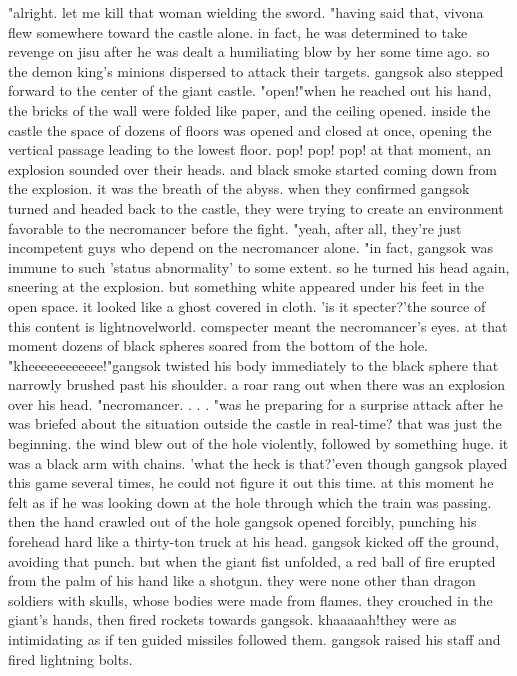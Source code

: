  "alright.
 let me kill that woman wielding the sword.
"having said that, vivona flew somewhere toward the castle alone.
in fact, he was determined to take revenge on jisu after he was dealt a humiliating blow by her some time ago.
so the demon king's minions dispersed to attack their targets.
gangsok also stepped forward to the center of the giant castle.
 "open!"when he reached out his hand, the bricks of the wall were folded like paper, and the ceiling opened.
 inside the castle the space of dozens of floors was opened and closed at once, opening the vertical passage leading to the lowest floor.
pop! pop! pop!
at that moment, an explosion sounded over their heads.
 and black smoke started coming down from the explosion.
 it was the breath of the abyss.
when they confirmed gangsok turned and headed back to the castle, they were trying to create an environment favorable to the necromancer before the fight.
"yeah, after all, they're just incompetent guys who depend on the necromancer alone.
"in fact, gangsok was immune to such 'status abnormality' to some extent.
 so he turned his head again, sneering at the explosion.
 but something white appeared under his feet in the open space.
 it looked like a ghost covered in cloth.
'is it specter?'the source of this content is lightnovelworld.
comspecter meant the necromancer's eyes.
at that moment dozens of black spheres soared from the bottom of the hole.
"kheeeeeeeeeeee!"gangsok twisted his body immediately to the black sphere that narrowly brushed past his shoulder.
 a roar rang out when there was an explosion over his head.
"necromancer.
.
.
.
"was he preparing for a surprise attack after he was briefed about the situation outside the castle in real-time? that was just the beginning.
the wind blew out of the hole violently, followed by something huge.
it was a black arm with chains.
'what the heck is that?'even though gangsok played this game several times, he could not figure it out this time.
 at this moment he felt as if he was looking down at the hole through which the train was passing.
 then the hand crawled out of the hole gangsok opened forcibly, punching his forehead hard like a thirty-ton truck at his head.
 gangsok kicked off the ground, avoiding that punch.
but when the giant fist unfolded, a red ball of fire erupted from the palm of his hand like a shotgun.
 they were none other than dragon soldiers with skulls, whose bodies were made from flames.
they crouched in the giant's hands, then fired rockets towards gangsok.
khaaaaah!they were as intimidating as if ten guided missiles followed them.
 gangsok raised his staff and fired lightning bolts.
